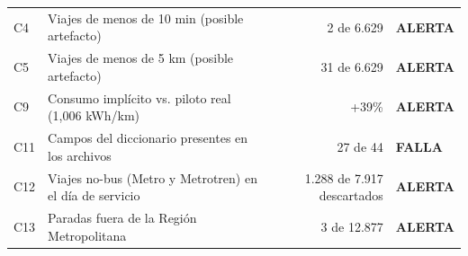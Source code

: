 
\begin{tabular}{l L{6.8cm} r l}
\thead{} &  &  & \thead{} \\
\midrule
C4 & Viajes de menos de 10 min (posible artefacto) & 2 de 6.629 & \textcolor{amber}{\textbf{ALERTA}} \\
C5 & Viajes de menos de 5 km (posible artefacto) & 31 de 6.629 & \textcolor{amber}{\textbf{ALERTA}} \\
C9 & Consumo implícito vs. piloto real (1{,}006 kWh/km) & +39\% & \textcolor{amber}{\textbf{ALERTA}} \\
C11 & Campos del diccionario presentes en los archivos & 27 de 44 & \textcolor{critred}{\textbf{FALLA}} \\
C12 & Viajes no-bus (Metro y Metrotren) en el día de servicio & 1.288 de 7.917 descartados & \textcolor{amber}{\textbf{ALERTA}} \\
C13 & Paradas fuera de la Región Metropolitana & 3 de 12.877 & \textcolor{amber}{\textbf{ALERTA}} \\
\bottomrule
\end{tabular}
